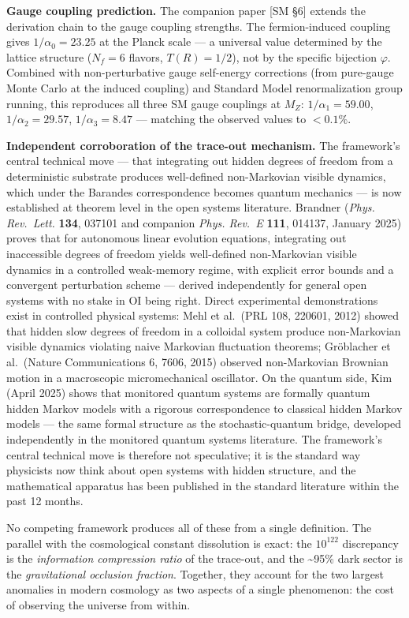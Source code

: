 \documentclass[
]{article}
\begin{document}
\textbf{Gauge coupling prediction.} The companion paper {[}SM §6{]}
extends the derivation chain to the gauge coupling strengths. The
fermion-induced coupling gives \(1/\alpha_0 = 23.25\) at the Planck
scale --- a universal value determined by the lattice structure
(\(N_f = 6\) flavors, \(T(R) = 1/2\)), not by the specific bijection
\(\varphi\). Combined with non-perturbative gauge self-energy
corrections (from pure-gauge Monte Carlo at the induced coupling) and
Standard Model renormalization group running, this reproduces all three
SM gauge couplings at \(M_Z\): \(1/\alpha_1 = 59.00\),
\(1/\alpha_2 = 29.57\), \(1/\alpha_3 = 8.47\) --- matching the observed
values to \(< 0.1\%\).

\textbf{Independent corroboration of the trace-out mechanism.} The
framework's central technical move --- that integrating out hidden
degrees of freedom from a deterministic substrate produces well-defined
non-Markovian visible dynamics, which under the Barandes correspondence
becomes quantum mechanics --- is now established at theorem level in the
open systems literature. Brandner (\emph{Phys. Rev.~Lett.} \textbf{134},
037101 and companion \emph{Phys. Rev.~E} \textbf{111}, 014137, January
2025) proves that for autonomous linear evolution equations, integrating
out inaccessible degrees of freedom yields well-defined non-Markovian
visible dynamics in a controlled weak-memory regime, with explicit error
bounds and a convergent perturbation scheme --- derived independently
for general open systems with no stake in OI being right. Direct
experimental demonstrations exist in controlled physical systems: Mehl
et al.~(PRL 108, 220601, 2012) showed that hidden slow degrees of
freedom in a colloidal system produce non-Markovian visible dynamics
violating naive Markovian fluctuation theorems; Gröblacher et
al.~(Nature Communications 6, 7606, 2015) observed non-Markovian
Brownian motion in a macroscopic micromechanical oscillator. On the
quantum side, Kim (April 2025) shows that monitored quantum systems are
formally quantum hidden Markov models with a rigorous correspondence to
classical hidden Markov models --- the same formal structure as the
stochastic-quantum bridge, developed independently in the monitored
quantum systems literature. The framework's central technical move is
therefore not speculative; it is the standard way physicists now think
about open systems with hidden structure, and the mathematical apparatus
has been published in the standard literature within the past 12 months.

No competing framework produces all of these from a single definition.
The parallel with the cosmological constant dissolution is exact: the
\(10^{122}\) discrepancy is the \emph{information compression ratio} of
the trace-out, and the \textasciitilde95\% dark sector is the
\emph{gravitational occlusion fraction}. Together, they account for the
two largest anomalies in modern cosmology as two aspects of a single
phenomenon: the cost of observing the universe from within.
\end{document}
